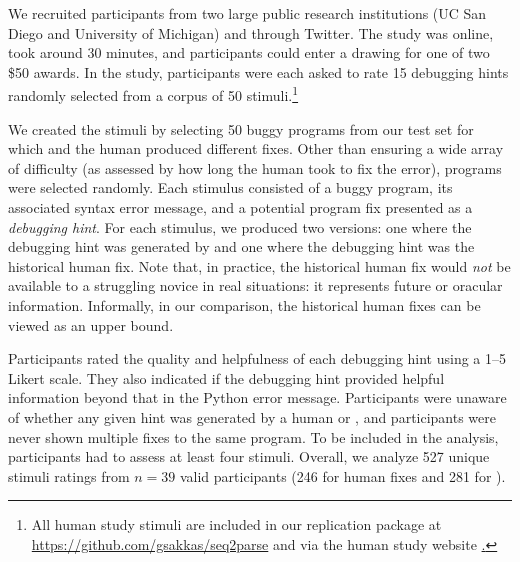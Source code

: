  We recruited participants from two large public
research institutions (UC San Diego and University of Michigan) and through
Twitter. The study was online, took around 30 minutes, and participants could
enter a drawing for one of two \$50 awards. In the study, participants were each
asked to rate 15 debugging hints randomly selected from a corpus of 50
stimuli.\footnote{All human study stimuli are included in our replication
package at \url{https://github.com/gsakkas/seq2parse} and via the human study
website
\href{https://dijkstra.eecs.umich.edu/~endremad/APR_HumanEval/}.}

We created the stimuli by selecting 50 buggy programs from our test set for
which \toolname and the human produced different fixes. Other than ensuring a
wide array of difficulty (as assessed by how long the human took to fix the
error), programs were selected randomly. Each stimulus consisted of a buggy
program, its associated syntax error message, and a potential program fix
presented as a \emph{debugging hint}. For each stimulus, we produced two
versions: one where the debugging hint was generated by \toolname and one where
the debugging hint was the historical human fix. Note that, in practice, the
historical human fix would \emph{not} be available to a struggling novice
in real situations: it represents future or oracular information. Informally, in
our comparison, the historical human fixes can be viewed as an upper bound.

Participants rated the quality and
helpfulness of each debugging hint using a 1--5 Likert scale. They also indicated
if the debugging hint provided helpful information beyond that in the Python
error message.
Participants were unaware of whether any given hint was generated by a human or
\toolname, and participants were never shown multiple
fixes to the same program. To be included in the analysis, participants
had to assess at least four stimuli. Overall, we analyze 527 unique stimuli
ratings from $n=39$ valid participants (246 for human fixes and 281 for
\toolname).


